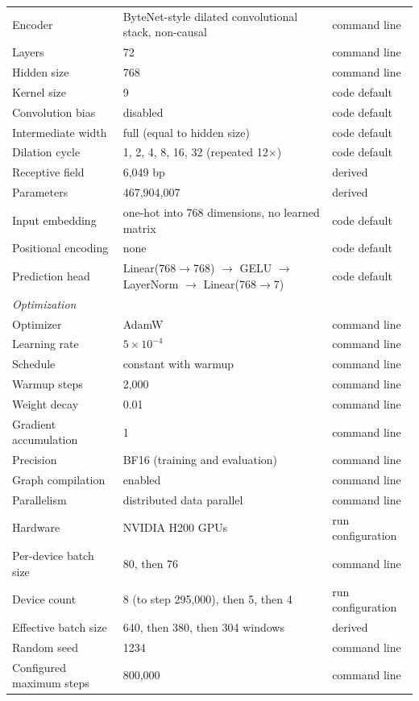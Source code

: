 {\begin{longtable}{p{}p{}p{}}
Encoder & ByteNet-style dilated convolutional stack, non-causal & command line \\
Layers & 72 & command line \\
Hidden size & 768 & command line \\
Kernel size & 9 & code default \\
Convolution bias & disabled & code default \\
Intermediate width & full (equal to hidden size) & code default \\
Dilation cycle & 1, 2, 4, 8, 16, 32 (repeated 12$\times$) & code default \\
Receptive field & 6,049 bp & derived \\
Parameters & 467,904,007 & derived \\
Input embedding & one-hot into 768 dimensions, no learned matrix & code default \\
Positional encoding & none & code default \\
Prediction head & Linear(768$\rightarrow$768) $\rightarrow$ GELU $\rightarrow$ LayerNorm $\rightarrow$ Linear(768$\rightarrow$7) & code default \\
\midrule
\multicolumn{3}{l}{\textit{Optimization}} \\
Optimizer & AdamW & command line \\
Learning rate & $5 \times 10^{-4}$ & command line \\
Schedule & constant with warmup & command line \\
Warmup steps & 2,000 & command line \\
Weight decay & 0.01 & command line \\
Gradient accumulation & 1 & command line \\
Precision & BF16 (training and evaluation) & command line \\
Graph compilation & enabled & command line \\
Parallelism & distributed data parallel & command line \\
Hardware & NVIDIA H200 GPUs & run configuration \\
Per-device batch size & 80, then 76 & command line \\
Device count & 8 (to step 295,000), then 5, then 4 & run configuration \\
Effective batch size & 640, then 380, then 304 windows & derived \\
Random seed & 1234 & command line \\
Configured maximum steps & 800,000 & command line \\

\end{longtable}}
